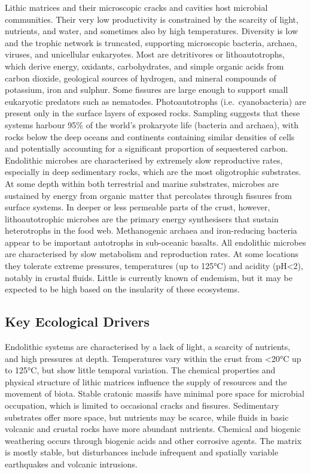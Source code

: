 \documentclass[
  letterpaper,
  DIV=11,
  numbers=noendperiod]{scrartcl}
\begin{document}
Lithic matrices and their microscopic cracks and cavities host microbial
communities. Their very low productivity is constrained by the scarcity
of light, nutrients, and water, and sometimes also by high temperatures.
Diversity is low and the trophic network is truncated, supporting
microscopic bacteria, archaea, viruses, and unicellular eukaryotes. Most
are detritivores or lithoautotrophs, which derive energy, oxidants,
carbohydrates, and simple organic acids from carbon dioxide, geological
sources of hydrogen, and mineral compounds of potassium, iron and
sulphur. Some fissures are large enough to support small eukaryotic
predators such as nematodes. Photoautotrophs (i.e.~cyanobacteria) are
present only in the surface layers of exposed rocks. Sampling suggests
that these systems harbour 95\% of the world's prokaryote life (bacteria
and archaea), with rocks below the deep oceans and continents containing
similar densities of cells and potentially accounting for a significant
proportion of sequestered carbon. Endolithic microbes are characterised
by extremely slow reproductive rates, especially in deep sedimentary
rocks, which are the most oligotrophic substrates. At some depth within
both terrestrial and marine substrates, microbes are sustained by energy
from organic matter that percolates through fissures from surface
systems. In deeper or less permeable parts of the crust, however,
lithoautotrophic microbes are the primary energy synthesisers that
sustain heterotrophs in the food web. Methanogenic archaea and
iron-reducing bacteria appear to be important autotrophs in sub-oceanic
basalts. All endolithic microbes are characterised by slow metabolism
and reproduction rates. At some locations they tolerate extreme
pressures, temperatures (up to 125°C) and acidity (pH\textless2),
notably in crustal fluids. Little is currently known of endemism, but it
may be expected to be high based on the insularity of these ecosystems.

\subsection{Key Ecological Drivers}\label{key-ecological-drivers-60}

Endolithic systems are characterised by a lack of light, a scarcity of
nutrients, and high pressures at depth. Temperatures vary within the
crust from \textless20°C up to 125°C, but show little temporal
variation. The chemical properties and physical structure of lithic
matrices influence the supply of resources and the movement of biota.
Stable cratonic massifs have minimal pore space for microbial
occupation, which is limited to occasional cracks and fissures.
Sedimentary substrates offer more space, but nutrients may be scarce,
while fluids in basic volcanic and crustal rocks have more abundant
nutrients. Chemical and biogenic weathering occurs through biogenic
acids and other corrosive agents. The matrix is mostly stable, but
disturbances include infrequent and spatially variable earthquakes and
volcanic intrusions.
\end{document}
